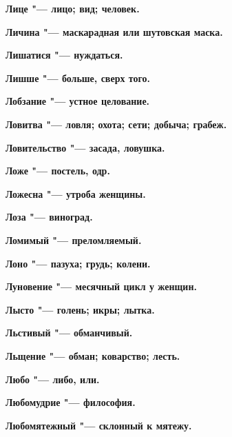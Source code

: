 \begin{mymulticols}{2}
\bfseries Лице\normalfont{} "--- лицо; вид; человек. 




\bfseries Личина\normalfont{} "--- маскарадная или шутовская маска. 




\bfseries Лишатися\normalfont{} "--- нуждаться. 




\bfseries Лишше\normalfont{} "--- больше, сверх того. 




\bfseries Лобзание\normalfont{} "--- устное целование. 




\bfseries Ловитва\normalfont{} "--- ловля; охота; сети; добыча; грабеж. 




\bfseries Ловительство\normalfont{} "--- засада, ловушка. 




\bfseries Ложе\normalfont{} "--- постель, одр. 




\bfseries Ложесна\normalfont{} "--- утроба женщины. 




\bfseries Лоза\normalfont{} "--- виноград. 




\bfseries Ломимый\normalfont{} "--- преломляемый. 




\bfseries Лоно\normalfont{} "--- пазуха; грудь; колени. 




\bfseries Луновение\normalfont{} "--- месячный цикл у женщин. 




\bfseries Лысто\normalfont{} "--- голень; икры; лытка. 




\bfseries Льстивый\normalfont{} "--- обманчивый. 




\bfseries Льщение\normalfont{} "--- обман; коварство; лесть. 




\bfseries Любо\normalfont{} "--- либо, или. 




\bfseries Любомудрие\normalfont{} "--- философия. 




\bfseries Любомятежный\normalfont{} "--- склонный к мятежу. 





\end{mymulticols}
